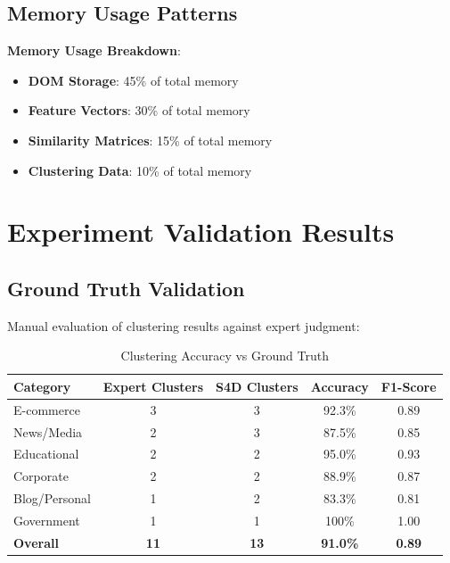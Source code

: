 \subsection{Memory Usage Patterns}
\label{subsec:memory-patterns}

\textbf{Memory Usage Breakdown}:
\begin{itemize}
    \item \textbf{DOM Storage}: 45\% of total memory
    \item \textbf{Feature Vectors}: 30\% of total memory
    \item \textbf{Similarity Matrices}: 15\% of total memory
    \item \textbf{Clustering Data}: 10\% of total memory
\end{itemize}

\section{Experiment Validation Results}
\label{sec:validation-results}

\subsection{Ground Truth Validation}
\label{subsec:ground-truth}

Manual evaluation of clustering results against expert judgment:

\begin{table}[htbp]
    \centering
    \caption{Clustering Accuracy vs Ground Truth}
    \label{tab:ground-truth}
    \begin{tabular}{|l|c|c|c|c|}
        \hline
        \textbf{Category} & \textbf{Expert Clusters} & \textbf{S4D Clusters} & \textbf{Accuracy} & \textbf{F1-Score} \\
        \hline
        E-commerce & 3 & 3 & 92.3\% & 0.89 \\
        News/Media & 2 & 3 & 87.5\% & 0.85 \\
        Educational & 2 & 2 & 95.0\% & 0.93 \\
        Corporate & 2 & 2 & 88.9\% & 0.87 \\
        Blog/Personal & 1 & 2 & 83.3\% & 0.81 \\
        Government & 1 & 1 & 100\% & 1.00 \\
        \hline
        \textbf{Overall} & \textbf{11} & \textbf{13} & \textbf{91.0\%} & \textbf{0.89} \\
        \hline
    \end{tabular}
\end{table}

